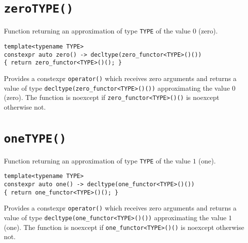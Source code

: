 \documentclass[oneside]{book}
\begin{document}
\section{\texttt{zero\textlangle TYPE\textrangle()}}
Function returning an approximation of type \texttt{TYPE} of the value $0$ (zero).
\begin{verbatim}
template<typename TYPE>
constexpr auto zero() -> decltype(zero_functor<TYPE>()())
{ return zero_functor<TYPE>()(); }
\end{verbatim}

\noindent{}Provides a constexpr \texttt{operator()} which receives zero arguments and returns a value of type
\texttt{decltype\allowbreak(zero\allowbreak\_functor\allowbreak<TYPE>\allowbreak()())} approximating the value $0$ (zero).
The function is noexcept if \texttt{zero\allowbreak\_\allowbreak functor<TYPE>()()} is noexcept otherwise not.

\section{\texttt{one\textlangle TYPE\textrangle()}}
Function returning an approximation of type \texttt{TYPE} of the value $1$ (one).
\begin{verbatim}
template<typename TYPE>
constexpr auto one() -> decltype(one_functor<TYPE>()())
{ return one_functor<TYPE>()(); }
\end{verbatim}

\noindent{}Provides a constexpr \texttt{operator()} which receives zero arguments and returns a value of type
\texttt{decltype(one\allowbreak\_functor\allowbreak<TYPE>\allowbreak()())} approximating the value $1$ (one).
The function is noexcept if \texttt{one\allowbreak\_\allowbreak functor<TYPE>()()} is noexcept otherwise not.
\end{document}

